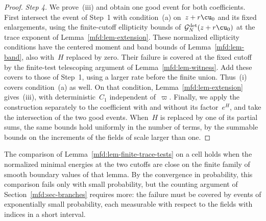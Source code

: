 \documentclass[11pt]{amsart}
\begin{document}
\begin{proof}
\smallskip

\emph{Step 4.} We prove~(iii) and obtain one good event for both coefficients. First intersect the event of Step~1 with condition~(a) on~$z+r\cu_0$ and its fixed enlargements, using the finite-cutoff ellipticity bounds of~$\mathcal G_N^{\rm det}(z+r\cu_0)$ at the trace exponent of Lemma~\ref{mfd:lem-extension}. These normalized ellipticity conditions have the centered moment and band bounds of Lemma~\ref{mfd:lem-band}, also with~$H$ replaced by zero. Their failure is covered at the fixed cutoff by the finite-test telescoping argument of Lemma~\ref{mfd:lem-witness}. Add these covers to those of Step~1, using a larger rate before the finite union. Thus~(i) covers condition~(a) as well. On that condition, Lemma~\ref{mfd:lem-extension} gives~(iii), with deterministic~$C_1$ independent of~$\varpi$. Finally, we apply the construction separately to the coefficient with and without its factor~$e^H$, and take the intersection of the two good events. When~$H$ is replaced by one of its partial sums, the same bounds hold uniformly in the number of terms, by the summable bounds on the increments of the fields of scale larger than one.
\end{proof}

The comparison of Lemma~\ref{mfd:lem-finite-trace-tests} on a cell holds when the normalized minimal energies at the two cutoffs are close on the finite family of smooth boundary values of that lemma. By the convergence in probability, this comparison fails only with small probability, but the counting argument of Section~\ref{mfd:sec-branches} requires more: the failure must be covered by events of exponentially small probability, each measurable with respect to the fields with indices in a short interval.
\end{document}
